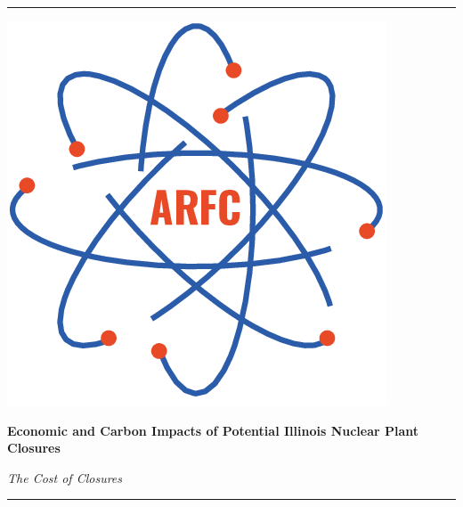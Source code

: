 \begin{titlepage} %
    \newcommand{\HRule}{\rule{\linewidth}{0.5mm}} %

    \center %

    \HRule
    \vspace{0.2cm}
     \begin{minipage}{0.4\textwidth}
        \includegraphics[width=\textwidth]{./img/arfc-logo.png}
        \end{minipage}%
        \begin{minipage}{0.6\textwidth}
        {\begin{flushright}\huge\bfseries Economic and Carbon Impacts of Potential Illinois Nuclear Plant Closures\end{flushright}}
        {\begin{flushright}\large\textit{The Cost of Closures}\end{flushright}}
        \end{minipage}

    \vspace{0.2cm}
    \HRule
    \vspace{0.5cm}


\end{titlepage}
